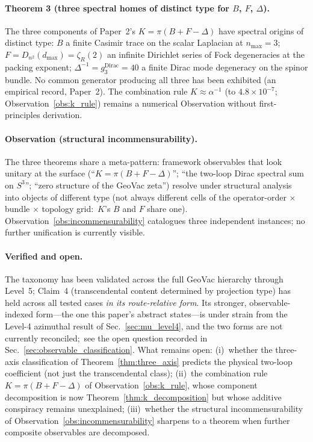 \documentclass[aps,pra,twocolumn,superscriptaddress,longbibliography]{revtex4-2}
\begin{document}
\paragraph{Theorem 3 (three spectral homes of distinct type for $B$, $F$, $\Delta$).}
The three components of Paper~2's $K = \pi(B + F - \Delta)$ have
spectral origins of distinct type:
$B$ a finite Casimir trace on the scalar Laplacian at $n_{\max}=3$;
$F = D_{n^2}(d_{\max}) = \zeta_R(2)$ an infinite Dirichlet series
of Fock degeneracies at the packing exponent;
$\Delta^{-1} = g_3^{\mathrm{Dirac}} = 40$ a finite Dirac mode
degeneracy on the spinor bundle.  No common generator producing all
three has been exhibited (an empirical record, Paper~2).  The combination rule $K \approx \alpha^{-1}$
(to $4.8\times10^{-7}$; Observation~\ref{obs:k_rule}) remains a
numerical Observation without first-principles derivation.

\paragraph{Observation (structural incommensurability).}
The three theorems share a meta-pattern: framework observables that
look unitary at the surface
(``$K = \pi(B + F - \Delta)$'';
``the two-loop Dirac spectral sum on $S^3$'';
``zero structure of the GeoVac zeta'')
resolve under structural analysis into objects of different type
(not always different cells of the operator-order $\times$ bundle
$\times$ topology grid:\ $K$'s $B$ and $F$ share one).
Observation~\ref{obs:incommensurability} catalogues three independent
instances; no further unification is currently visible.

\paragraph{Verified and open.}
The taxonomy has been validated across the full GeoVac hierarchy
through Level~5; Claim~4 (transcendental content determined by
projection type) has held across all tested cases \emph{in its
route-relative form}.  Its stronger, observable-indexed form---the one
this paper's abstract states---is under strain from the Level-4
azimuthal result of Sec.~\ref{sec:mu_level4}, and the two forms are not
currently reconciled;\ see the open question recorded in
Sec.~\ref{sec:observable_classification}.  What remains
open: (i)~whether the three-axis classification of
Theorem~\ref{thm:three_axis} predicts the physical two-loop
coefficient (not just the transcendental class); (ii)~the
combination rule $K = \pi(B + F - \Delta)$ of
Observation~\ref{obs:k_rule}, whose component decomposition is now
Theorem~\ref{thm:k_decomposition} but whose additive conspiracy
remains unexplained; (iii)~whether the structural incommensurability
of Observation~\ref{obs:incommensurability} sharpens to a theorem
when further composite observables are decomposed.
\end{document}

